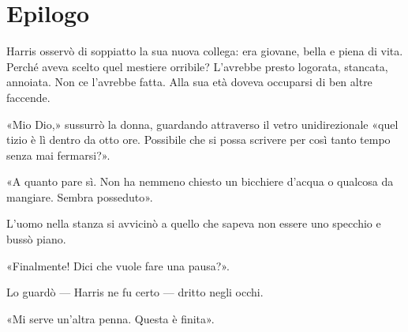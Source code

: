 \chapter{Epilogo}
\label{ch:epilogo}

Harris osservò di soppiatto la sua nuova collega: era giovane, bella e piena di vita. Perché aveva
scelto quel mestiere orribile? L'avrebbe presto logorata, stancata, annoiata. Non ce l'avrebbe
fatta. Alla sua età doveva occuparsi di ben altre faccende.

«Mio Dio,» sussurrò la donna, guardando attraverso il vetro unidirezionale «quel tizio è lì dentro
da otto ore. Possibile che si possa scrivere per così tanto tempo senza mai fermarsi?».

«A quanto pare sì. Non ha nemmeno chiesto un bicchiere d'acqua o qualcosa da mangiare. Sembra
posseduto».

L'uomo nella stanza si avvicinò a quello che sapeva non essere uno specchio e bussò piano.

«Finalmente! Dici che vuole fare una pausa?».

Lo guardò --- Harris ne fu certo --- dritto negli occhi.

«Mi serve un'altra penna. Questa è finita».
